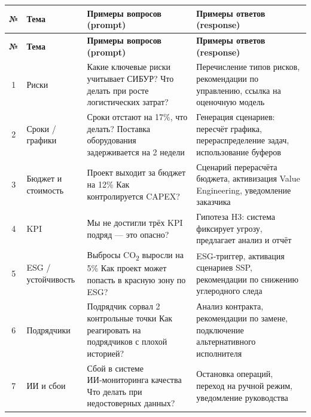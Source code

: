 \documentclass[12pt]{article}
\begin{document}
\begin{longtable}{|c|p{3.5cm}|p{5.2cm}|p{5.2cm}|}
\hline
\textbf{№} & \textbf{Тема} & \textbf{Примеры вопросов (prompt)} & \textbf{Примеры ответов (response)} \\
\hline
\endfirsthead
\hline
\textbf{№} & \textbf{Тема} & \textbf{Примеры вопросов (prompt)} & \textbf{Примеры ответов (response)} \\
\hline
\endhead

1 & Риски & Какие ключевые риски учитывает СИБУР? \newline Что делать при росте логистических затрат? & Перечисление типов рисков, рекомендации по управлению, ссылка на оценочную модель \\
\hline

2 & Сроки / графики & Сроки отстают на 17\%, что делать? \newline Поставка оборудования задерживается на 2 недели & Генерация сценариев: пересчёт графика, перераспределение задач, использование буферов \\
\hline

3 & Бюджет и стоимость & Проект выходит за бюджет на 12\% \newline Как контролируется CAPEX? & Сценарий перерасчёта бюджета, активизация Value Engineering, уведомление заказчика \\
\hline

4 & KPI & Мы не достигли трёх KPI подряд — это опасно? & Гипотеза H3: система фиксирует угрозу, предлагает анализ и отчёт \\
\hline

5 & ESG / устойчивость & Выбросы CO\textsubscript{2} выросли на 5\% \newline Как проект может попасть в красную зону по ESG? & ESG-триггер, активация сценариев SSP, рекомендации по снижению углеродного следа \\
\hline

6 & Подрядчики & Подрядчик сорвал 2 контрольные точки \newline Как реагировать на подрядчиков с плохой историей? & Анализ контракта, рекомендации по замене, подключение альтернативного исполнителя \\
\hline

7 & ИИ и сбои & Сбой в системе ИИ‑мониторинга качества \newline Что делать при недостоверных данных? & Остановка операций, переход на ручной режим, уведомление руководства \\
\hline

\end{longtable}
\end{document}
